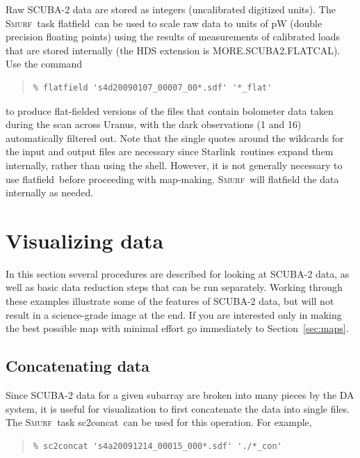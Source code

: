 \documentclass[twoside,11pt]{article}
\newenvironment{myquote}{\begin{quote}\begin{small}}{\end{small}\end{quote}}
\newcommand{\starlink}{\htmladdnormallink{Starlink}{http://starlink.jach.hawaii.edu}}
\newcommand{\smurf}{\xref{\textsc{Smurf}}{sun258}{}}
\newcommand{\task}[1]{\textsf{#1}}
\newcommand{\concat}{\xref{\task{sc2concat}}{sun258}{SC2CONCAT}}
\newcommand{\flatfield}{\xref{\task{flatfield}}{sun258}{FLATFIELD}}
\newcommand{\htmladdnormallink}[2]{#1}
\newcommand{\xref}[3]{#1}
\newcommand{\xlabel}[1]{}
\renewcommand{\_}{\texttt{\symbol{95}}}
\begin{document}
Raw SCUBA-2 data are stored as integers (uncalibrated digitized
units). The \smurf\ task \flatfield\ can be used to scale raw data to
units of pW (double precision floating points) using the results of
measurements of calibrated loads that are stored internally (the HDS
extension is MORE.SCUBA2.FLATCAL). Use the command

\begin{myquote}
\begin{verbatim}
% flatfield 's4d20090107_00007_00*.sdf' '*_flat'
\end{verbatim}
\end{myquote}
%
to produce flat-fielded versions of the files that contain bolometer
data taken during the scan across Uranus, with the dark observations
(1 and 16) automatically filtered out. Note that the single quotes
around the wildcards for the input and output files are necessary
since \starlink\ routines expand them internally, rather than using
the shell. However, it is not generally necessary to use \flatfield\
before proceeding with map-making. \smurf\ will flatfield the data
internally as needed.

\section{\xlabel{time_series}Visualizing data}
\label{sec:visual}

In this section several procedures are described for looking at
SCUBA-2 data, as well as basic data reduction steps that can be run
separately. Working through these examples illustrate some of the
features of SCUBA-2 data, but will not result in a science-grade image
at the end. If you are interested only in making the best possible map
with minimal effort go immediately to Section~\ref{sec:maps}.

\subsection{\xlabel{concat}Concatenating data}

Since SCUBA-2 data for a given subarray are broken into many pieces by
the DA system, it is useful for visualization to first concatenate the
data into single files. The \smurf\ task \concat\ can be used for this
operation. For example,

\begin{myquote}
\begin{verbatim}
% sc2concat 's4a20091214_00015_000*.sdf' './*_con'
\end{verbatim}
\end{myquote}
\end{document}
